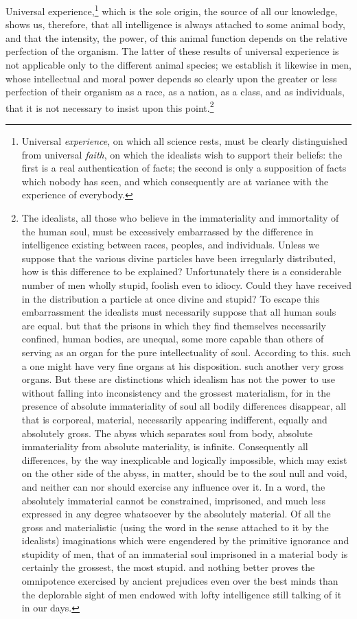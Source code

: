 \documentclass[12pt]{report}
\begin{document}
\clearpage
Universal experience,\footnote{Universal \emph{experience}, on which all science rests, must be clearly distinguished from universal \emph{faith}, on which the idealists wish to support their beliefs: the first is a real authentication of facts; the second is only a supposition of facts which nobody has seen, and which consequently are at variance with the experience of everybody.} which is the sole origin, the source of all our knowledge, shows us, therefore, that all intelligence is always attached to some animal body, and that the intensity, the power, of this animal function depends on the relative perfection of the organism. The latter of these results of universal experience is not applicable only to the different animal species; we establish it likewise in men, whose intellectual and moral power depends so clearly upon the greater or less perfection of their organism as a race, as a nation, as a class, and as individuals, that it is not necessary to insist upon this point.\footnote{The idealists, all those who believe in the immateriality and immortality of the human soul, must be excessively embarrassed by the difference in intelligence existing between races, peoples, and individuals. Unless we suppose that the various divine particles have been irregularly distributed, how is this difference to be explained? Unfortunately there is a considerable number of men wholly stupid, foolish even to idiocy. Could they have received in the distribution a particle at once divine and stupid? To escape this embarrassment the idealists must necessarily suppose that all human souls are equal. but that the prisons in which they find themselves necessarily confined, human bodies, are unequal, some more capable than others of serving as an organ for the pure intellectuality of soul. According to this. such a one might have very fine organs at his disposition. such another very gross organs. But these are distinctions which idealism has not the power to use without falling into inconsistency and the grossest materialism, for in the presence of absolute immateriality of soul all bodily differences disappear, all that is corporeal, material, necessarily appearing indifferent, equally and absolutely gross. The abyss which separates soul from body, absolute immateriality from absolute materiality, is infinite. Consequently all differences, by the way inexplicable and logically impossible, which may exist on the other side of the abyss, in matter, should be to the soul null and void, and neither can nor should exercise any influence over it. In a word, the absolutely immaterial cannot be constrained, imprisoned, and much less expressed in any degree whatsoever by the absolutely material. Of all the gross and materialistic (using the word in the sense attached to it by the idealists) imaginations which were engendered by the primitive ignorance and stupidity of men, that of an immaterial soul imprisoned in a material body is certainly the grossest, the most stupid. and nothing better proves the omnipotence exercised by ancient prejudices even over the best minds than the deplorable sight of men endowed with lofty intelligence still talking of it in our days.}
\end{document}
